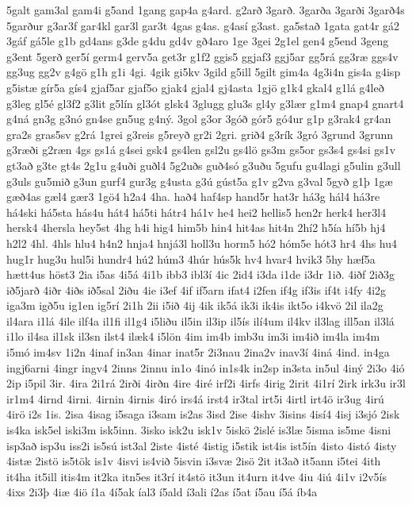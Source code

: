 {5galt
gam3al
gam4i
g5and
1gang
gap4a
g4ard.
g2arð
3garð.
3garða
3garði
3garð4s
5garður
g3ar3f
gar4kl
gar3l
gar3t
4gas
g4as.
g4así
g3ast.
ga5stað
1gata
gat4r
gá2
3gáf
gá5le
g1b
gd4ans
g3de
g4du
gd4v
gð4aro
1ge
3gei
2g1el
gen4
g5end
3geng
g3ent
5gerð
ger5í
germ4
gerv5a
get3r
g1f2
ggis5
ggjaf3
ggj5ar
gg5rá
gg3ræ
ggs4v
gg3ug
gg2v
g4gö
g1h
g1i
4gi.
4gik
gi5kv
3gild
g5ill
5gilt
gim4a
4g3i4n
gis4a
g4isp
g5istæ
gír5a
gís4
gjaf5ar
gjaf5o
gjak4
gjal4
gj4asta
1gjö
g1k4
gkal4
g1lá
g4leð
g3leg
gl5é
gl3f2
g3lit
g5lín
gl3ót
glsk4
3glugg
glu3s
gl4y
g3lær
g1m4
gnap4
gnart4
g4ná
gn3g
g3nó
gn4se
gn5ug
g4ný.
3gol
g3or
3góð
gór5
gó4ur
g1p
g3rak4
gr4an
gra2s
gras5sv
g2rá
1grei
g3reis
g5reyð
gr2i
2gri.
grið4
g3rík
3gró
3grund
3grunn
g3ræði
g2ræn
4gs
gs1á
g4sei
gsk4
gs4len
gsl2u
gs4lö
gs3m
gs5or
gs3s4
gs4si
gs1v
gt3að
g3te
gt4s
2g1u
g4uði
guðl4
5g2uðs
guð4só
g3uðu
5gufu
gu4lagi
g5ulin
g3ull
g3uls
gu5mið
g3un
gurf4
gur3g
g4usta
g3ú
gúst5a
g1v
g2va
g3val
5gyð
g1þ
1gæ
gæð4as
gæl4
gær3
1gö4
h2a4
4ha.
hað4
haf4sp
hand5r
hat3r
há3g
hál4
há3re
há4ski
há5sta
hás4u
hát4
há5ti
hátr4
há1v
he4
hei2
hellis5
hen2r
herk4
her3l4
hersk4
4hersla
hey5st
4hg
h4i
hig4
him5b
hin4
hit4as
hit4n
2hí2
h5ía
hí5b
hj4
h2l2
4hl.
4hls
hlu4
h4n2
hnja4
hnjá3l
holl3u
horm5
hó2
hóm5e
hót3
hr4
4hs
hu4
hug1r
hug3u
hul5i
hundr4
hú2
húm3
4húr
hús5k
hv4
hvar4
hvik3
5hy
hæf5a
hætt4us
höst3
2ia
i5as
4i5á
4i1b
ibb3
ibl3í
4ic
2id4
i3da
i1de
i3dr
1ið.
4iðf
2ið3g
ið5jarð
4iðr
4iðs
ið5sal
2iðu
4ie
i3ef
4if
if5arn
ifat4
i2fen
if4g
if3is
if4t
i4fy
4i2g
iga3m
igð5u
ig1en
ig5rí
2i1h
2ii
i5ið
4ij
4ik
ik5á
ik3i
ik4is
ikt5o
i4kvö
2il
ila2g
il4ara
i1lá
4ile
ilf4a
il1fi
il1g4
i5liðu
il5in
il3ip
il5ís
ilí4um
il4kv
il3lag
ill5an
il3lá
i1lo
il4sa
il1sk
il3sn
ilst4
ilæk4
i5lön
4im
im4b
imb3u
im3i
im4ið
im4la
im4m
i5mó
im4sv
1i2n
4inaf
in3an
4inar
inat5r
2i3nau
2ina2v
inav3í
4iná
4ind.
in4ga
ingj6arni
4ingr
ingv4
2inns
2innu
in1o
4inó
in1s4k
in2sp
in3sta
in5ul
4iný
2i3o
4ió
2ip
i5pil
3ir.
4ira
2i1rá
2irði
4irðn
4ire
4iré
irf2i
4irfs
4irig
2irit
4i1rí
2irk
irk3u
ir3l
ir1m4
4irnd
4irni.
4irnin
4irnis
4iró
irs4á
irst4
ir3tal
irt5i
4irtl
irt4ö
ir3ug
4irú
4irö
i2s
1is.
2isa
4isag
i5saga
i3sam
is2as
3isd
2ise
4ishv
3isins
4isí4
4isj
i3sjó
2isk
is4ka
isk5el
iski3m
isk5inn.
3isko
isk2u
isk1v
5iskö
2islé
is3læ
5isma
is5me
4isni
isp3að
isp3u
iss2i
is5sú
ist3al
2iste
4isté
4istig
i5stik
ist4is
ist5ín
4isto
4istó
4isty
4istæ
2istö
is5tök
is1v
4isvi
is4við
5isvin
i3svæ
2isö
2it
it3að
it5ann
i5tei
4ith
it4ha
it5ill
itis4m
it2ka
itn5es
it3rí
it4stö
it3un
it4urn
it4ve
4iu
4iú
4i1v
i2v5ís
4ixs
2i3þ
4iæ
4iö
í1a
4í5ak
íal3
í5ald
í3ali
í2as
í5at
í5au
í5á
íb4a
}
